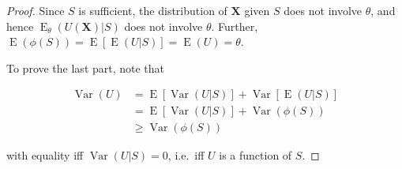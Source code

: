 \documentclass[
]{book}
\newcommand{\bX}{{\boldsymbol X}}
\DeclareMathOperator{\E}{E}
\DeclareMathOperator{\Var}{Var}
\theoremstyle{definition}
\theoremstyle{definition}
\theoremstyle{definition}
\theoremstyle{definition}
\theoremstyle{remark}
\begin{document}
\begin{proof}
Since \(S\) is sufficient, the distribution of \(\bX\) given \(S\) does not involve \(\theta\), and hence \(\E_\theta(U(\bX)|S)\) does not involve \(\theta\). Further, \(\E(\phi(S)) = \E\left[ \E(U|S) \right] = \E(U) = \theta\).

To prove the last part, note that

\begin{align*}
\Var(U) 
&= \E\left[ \Var(U|S) \right] + \Var\left[ \E(U|S) \right] \\
&= \E\left[ \Var(U|S) \right] + \Var(\phi(S)) \\
&\geq \Var(\phi(S))
\end{align*}

with equality iff \(\Var(U|S) =0\), i.e.~iff \(U\) is a function of \(S\).
\end{proof}
\end{document}
